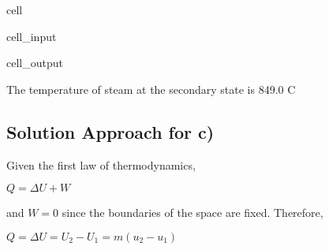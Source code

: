\documentclass[letterpaper,10pt,english]{jupyterBook}
\begin{document}
\begin{sphinxuseclass}{cell}
\begin{sphinxVerbatimInput}
\begin{sphinxuseclass}{cell_input}
\end{sphinxuseclass}\end{sphinxVerbatimInput}
\begin{sphinxVerbatimOutput}

\begin{sphinxuseclass}{cell_output}
\begin{sphinxVerbatim}[commandchars=\\\{\}]
The temperature of steam at the secondary state is 849.0 C
\end{sphinxVerbatim}

\end{sphinxuseclass}\end{sphinxVerbatimOutput}

\end{sphinxuseclass}

\subsection{Solution Approach for c)}
\label{\detokenize{notebooks/Chapter5/CH5-Q1:solution-approach-for-c}}
\sphinxAtStartPar
Given the first law of thermodynamics,

\sphinxAtStartPar
\(Q=\Delta U + W\)

\sphinxAtStartPar
and \(W = 0\) since the boundaries of the space are fixed. Therefore,

\sphinxAtStartPar
\(Q=\Delta U=U_2 - U_1=m(u_2-u_1)\)
\end{document}
